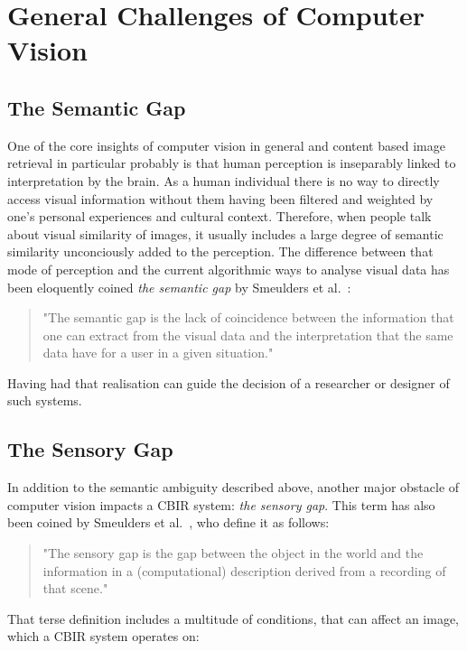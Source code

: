 \section{General Challenges of Computer Vision}

\subsection{The Semantic Gap}

One of the core insights of computer vision in general and content based image
retrieval in particular probably is that human perception is inseparably linked
to interpretation by the brain. As a human individual there is no way to
directly access visual information without them having been filtered and
weighted by one's personal experiences and cultural context. Therefore, when
people talk about visual similarity of images, it usually includes a large
degree of semantic similarity unconciously added to the perception. The
difference between that mode of perception and the current algorithmic ways to
analyse visual data has been eloquently coined \emph{the semantic gap} by
Smeulders et al.\ \autocite{smeulders_content-based_2000}:

\begin{quote}
"The semantic gap is the lack of coincidence between the information that one
can extract from the visual data and the interpretation that the same data have
for a user in a given situation."
\end{quote}

Having had that realisation can guide the decision of a researcher or designer
of such systems.

\subsection{The Sensory Gap}

In addition to the semantic ambiguity described above, another major obstacle
of computer vision impacts a CBIR system: \emph{the sensory gap}. This term has
also been coined by Smeulders et al.\ \autocite{smeulders_content-based_2000},
who define it as follows:

\begin{quote}
"The sensory gap is the gap between the object in the world and the information
in a (computational) description derived from a recording of that scene."
\end{quote}

That terse definition includes a multitude of conditions, that can affect an
image, which a CBIR system operates on:

